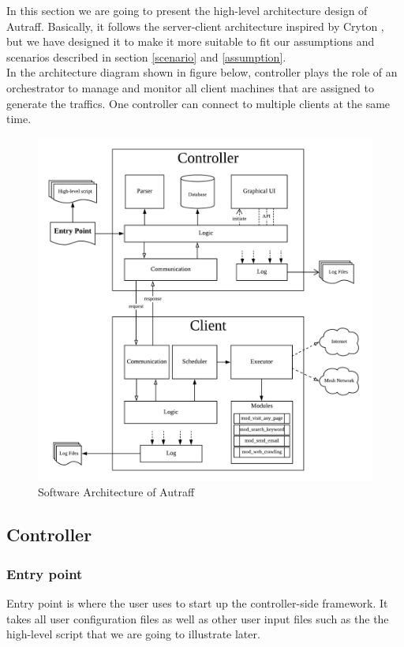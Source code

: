 \documentclass[12pt]{report}
\begin{document}
In this section we are going to present the high-level architecture design of Autraff. Basically, it follows the server-client architecture inspired by Cryton \citep{Cryton}, but we have designed it to make it more suitable to fit our assumptions and scenarios described in section \ref{scenario} and \ref{assumption}.\\

In the architecture diagram shown in figure below, controller plays the role of an orchestrator to manage and monitor all client machines that are assigned to generate the traffics. One controller can connect to multiple clients at the same time. 

\vfill

\begin{figure}[h!]
	\centering
	\includegraphics[width=1\textwidth]{./pictures/autraff-arc}
	\caption{Software Architecture of Autraff}
\end{figure}


\subsection{Controller}
\subsubsection{Entry point}
Entry point is where the user uses to start up the controller-side framework. It takes all user configuration files as well as other user input files such as the the high-level script that we are going to illustrate later.
\end{document}

